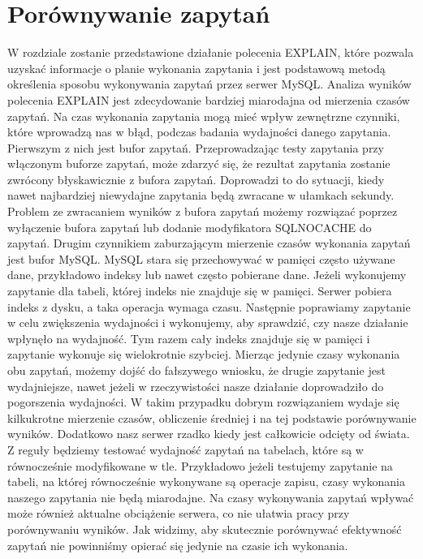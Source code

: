 \section{Porównywanie zapytań}
W rozdziale zostanie przedstawione działanie polecenia EXPLAIN, które pozwala uzyskać informacje o planie wykonania zapytania i jest podstawową metodą określenia sposobu wykonywania zapytań przez serwer MySQL. Analiza wyników polecenia EXPLAIN jest zdecydowanie bardziej miarodajna od mierzenia czasów zapytań. Na czas wykonania zapytania mogą mieć wpływ zewnętrzne czynniki, które wprowadzą nas w błąd, podczas badania wydajności danego zapytania. Pierwszym z nich jest bufor zapytań. Przeprowadzając testy zapytania przy włączonym buforze zapytań, może zdarzyć się, że rezultat zapytania zostanie zwrócony błyskawicznie z bufora zapytań. Doprowadzi to do sytuacji, kiedy nawet najbardziej niewydajne zapytania będą zwracane w ułamkach sekundy.  Problem ze zwracaniem wyników z bufora zapytań możemy rozwiązać poprzez wyłączenie bufora zapytań lub dodanie modyfikatora SQL\textunderscore NO\textunderscore CACHE do zapytań. Drugim czynnikiem zaburzającym mierzenie czasów wykonania zapytań jest bufor MySQL. MySQL stara się przechowywać w pamięci często używane dane, przykładowo indeksy lub nawet często pobierane dane. Jeżeli wykonujemy zapytanie dla tabeli, której indeks nie znajduje się w pamięci. Serwer pobiera indeks z dysku, a taka operacja wymaga czasu. Następnie poprawiamy zapytanie w celu zwiększenia wydajności i wykonujemy, aby sprawdzić, czy nasze działanie wpłynęło na wydajność. Tym razem cały indeks znajduje się w pamięci i zapytanie wykonuje się wielokrotnie szybciej. Mierząc jedynie czasy wykonania obu zapytań, możemy dojść do fałszywego wniosku, że drugie zapytanie jest wydajniejsze, nawet jeżeli w rzeczywistości nasze działanie doprowadziło do pogorszenia wydajności. W takim przypadku dobrym rozwiązaniem wydaje się kilkukrotne mierzenie czasów, obliczenie średniej i na tej podstawie porównywanie wyników. Dodatkowo nasz serwer rzadko kiedy jest całkowicie odcięty od świata. Z reguły będziemy testować wydajność zapytań na tabelach, które są w równocześnie modyfikowane w tle. Przykładowo jeżeli testujemy zapytanie na tabeli, na której równocześnie wykonywane są operacje zapisu, czasy wykonania naszego zapytania nie będą miarodajne. Na czasy wykonywania zapytań wpływać może również aktualne obciążenie serwera, co nie ułatwia pracy przy porównywaniu wyników. Jak widzimy, aby skutecznie porównywać efektywność zapytań nie powinniśmy opierać się jedynie na czasie ich wykonania.
